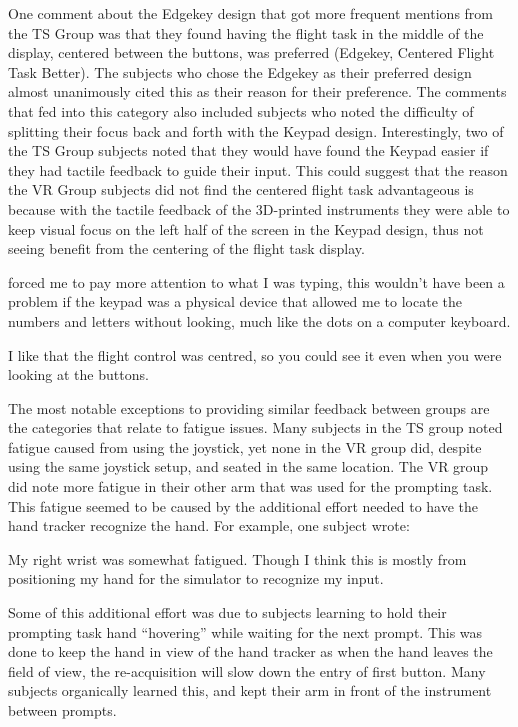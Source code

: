 One comment about the Edgekey design that got more frequent mentions from the TS Group was that they found having the flight task in the middle of the display, centered between the buttons, was preferred (Edgekey, Centered Flight Task Better).
The subjects who chose the Edgekey as their preferred design almost unanimously cited this as their reason for their preference.
The comments that fed into this category also included subjects who noted the difficulty of splitting their focus back and forth with the Keypad design.
Interestingly, two of the TS Group subjects noted that they would have found the Keypad easier if they had tactile feedback to guide their input.
This could suggest that the reason the VR Group subjects did not find the centered flight task advantageous is because with the tactile feedback of the 3D-printed instruments they were able to keep visual focus on the left half of the screen in the Keypad design, thus not seeing benefit from the centering of the flight task display.
\begin{displayquote}[TS Subject]
     forced me to pay more attention to what I was typing, this wouldn't have been a problem if the keypad was a physical device that allowed me to locate the numbers and letters without looking, much like the dots on a computer keyboard.
\end{displayquote}
\begin{displayquote}[VR Subject]
    I like that the flight control was cent\textins[e]red, so you could see it even when you were looking at the buttons.
\end{displayquote}

The most notable exceptions to providing similar feedback between groups are the categories that relate to fatigue issues.
Many subjects in the TS group noted fatigue caused from using the joystick, yet none in the VR group did, despite using the same joystick setup, and seated in the same location.
The VR group did note more fatigue in their other arm that was used for the prompting task.
This fatigue seemed to be caused by the additional effort needed to have the hand tracker recognize the hand.
For example, one subject wrote:
\begin{displayquote}[VR Subject]
    My right wrist was somewhat fatigued.  Though I think this is mostly from positioning my hand for the simulator to recognize my input.
\end{displayquote}
Some of this additional effort was due to subjects learning to hold their prompting task hand ``hovering'' while waiting for the next prompt.
This was done to keep the hand in view of the hand tracker as when the hand leaves the field of view, the re-acquisition will slow down the entry of first button.
Many subjects organically learned this, and kept their arm in front of the instrument between prompts.

